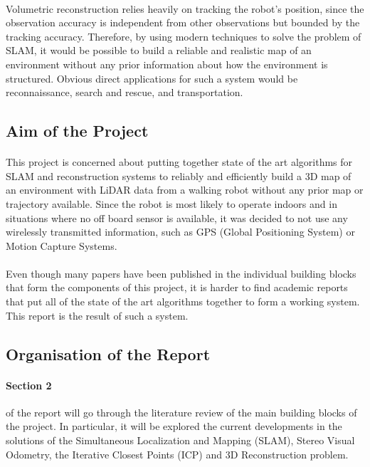 \documentclass[11pt]{article}
\begin{document}
	\paragraph{}
	Volumetric reconstruction relies heavily on tracking the robot's position, since the observation accuracy is independent from other observations but bounded by the tracking accuracy. Therefore, by using modern techniques to solve the problem of SLAM, it would be possible to build a reliable and realistic map of an environment without any prior information about how the environment is structured. Obvious direct applications for such a system would be reconnaissance, search and rescue, and transportation.
	
	\subsection{Aim of the Project}
	\paragraph{}
	This project is concerned about putting together state of the art algorithms for SLAM and reconstruction systems to reliably and efficiently build a 3D map of an environment with LiDAR data from a walking robot without any prior map or trajectory available. Since the robot is most likely to operate indoors and in situations where no off board sensor is available, it was decided to not use any wirelessly transmitted information, such as GPS (Global Positioning System) or Motion Capture Systems.
	
	\paragraph{}
	Even though many papers have been published in the individual building blocks that form the components of this project, it is harder to find academic reports that put all of the state of the art algorithms together to form a working system. This report is the result of such a system.
	
	\subsection{ Organisation of the Report}
		\paragraph{Section 2} of the report will go through the literature review of the main building blocks of the project. In particular, it will be explored the current developments in the solutions of the Simultaneous Localization and Mapping (SLAM), Stereo Visual Odometry, the Iterative Closest Points (ICP) and 3D Reconstruction problem.
		
\end{document}
